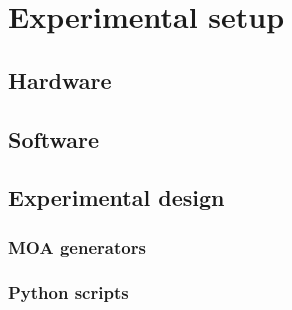 \section{Experimental setup}
\label{Benchmarking:Experimental}

\subsection{Hardware}
\label{Benchmarking:Experimental:Hardware}

\subsection{Software}
\label{Benchmarking:Experimental:Software}

\subsection{Experimental design}
\label{Benchmarking:Experimental:Design}

\subsubsection{MOA generators}

\subsubsection{Python scripts}